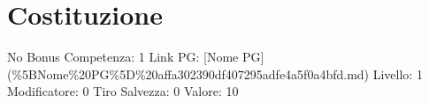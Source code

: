 \section{Costituzione}\label{costituzione}

\begin{description}
\tightlist
\item[Tags: STAT]
No Bonus Competenza: 1 Link PG: {[}Nome PG{]}
(\%5BNome\%20PG\%5D\%20affa302390df407295adfe4a5f0a4bfd.md) Livello: 1
Modificatore: 0 Tiro Salvezza: 0 Valore: 10
\end{description}

